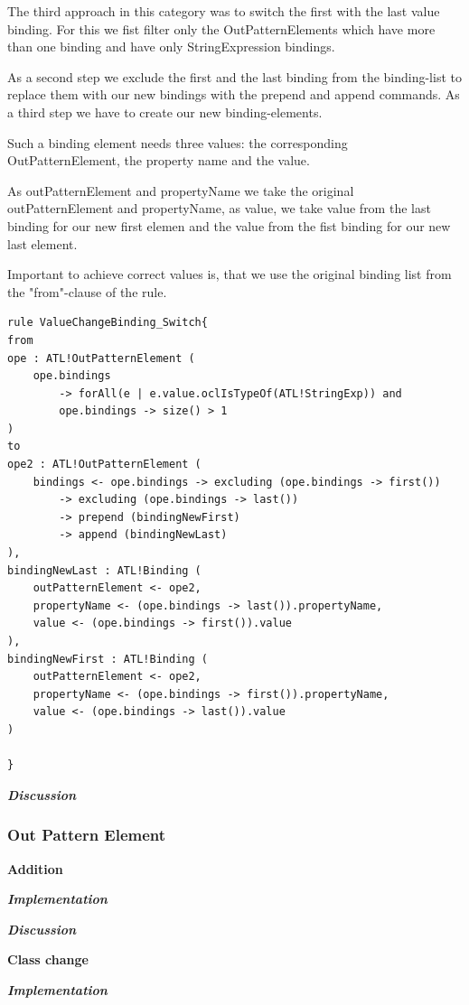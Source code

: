 \documentclass{llncs}
\begin{document}
The third approach in this category was to switch the first with the last value binding. For this we fist filter only the OutPatternElements which have more than one binding and have only StringExpression bindings.

As a second step we exclude the first and the last binding from the binding-list to replace them with our new bindings with the prepend and append commands. As a third step we have to create our new binding-elements.

Such a binding element needs three values: the corresponding OutPatternElement, the property name and the value.

As outPatternElement and propertyName we take the original outPatternElement and propertyName, as value, we take value from the last binding for our new first elemen and the value from the fist binding for our new last element.

Important to achieve correct values is, that we use the original binding list from the "from"-clause of the rule.

\begin{lstlisting}
rule ValueChangeBinding_Switch{
from
ope : ATL!OutPatternElement (
	ope.bindings 
		-> forAll(e | e.value.oclIsTypeOf(ATL!StringExp)) and
		ope.bindings -> size() > 1
)
to
ope2 : ATL!OutPatternElement (
	bindings <- ope.bindings -> excluding (ope.bindings -> first()) 
		-> excluding (ope.bindings -> last())
		-> prepend (bindingNewFirst)
		-> append (bindingNewLast)
), 
bindingNewLast : ATL!Binding (
	outPatternElement <- ope2, 
	propertyName <- (ope.bindings -> last()).propertyName,
	value <- (ope.bindings -> first()).value
),
bindingNewFirst : ATL!Binding (
	outPatternElement <- ope2,
	propertyName <- (ope.bindings -> first()).propertyName,
	value <- (ope.bindings -> last()).value	
)
	
}
\end{lstlisting}

\textbf\textit{{Discussion}}

\subsubsection{Out Pattern Element}

\textbf{Addition}

\textbf\textit{{Implementation}}

\textbf\textit{{Discussion}}

\textbf{Class change}

\textbf\textit{{Implementation}}
\end{document}
